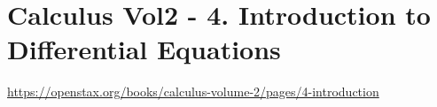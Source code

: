 \section{Calculus Vol2 - 4. Introduction to Differential Equations}

\url{https://openstax.org/books/calculus-volume-2/pages/4-introduction}

\clearpage
\clearpage
\clearpage
\clearpage
\clearpage
